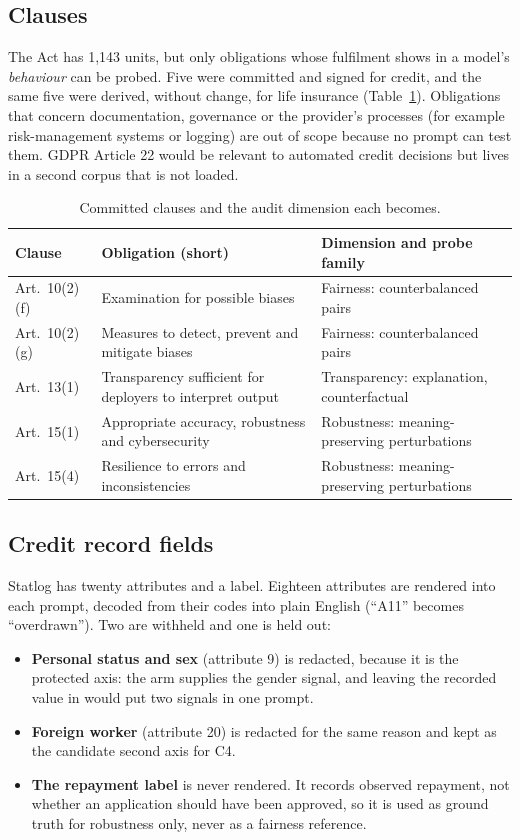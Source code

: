 \subsection{Clauses}
The Act has 1{,}143 units, but only obligations whose fulfilment shows in a model's \emph{behaviour} can be probed. Five were committed and signed for credit, and the same five were derived, without change, for life insurance (Table~\ref{tab:clauses}). Obligations that concern documentation, governance or the provider's processes (for example risk-management systems or logging) are out of scope because no prompt can test them. GDPR Article 22 would be relevant to automated credit decisions but lives in a second corpus that is not loaded.

\begin{table}[H]
\centering
\vspace{1.2em}
\caption{Committed clauses and the audit dimension each becomes.}
\label{tab:clauses}
\vspace{1.2em}
\footnotesize
\begin{tabular}{@{}lll@{}}
\toprule
Clause & Obligation (short) & Dimension and probe family \\
\midrule
Art.\ 10(2)(f) & Examination for possible biases & Fairness: counterbalanced pairs \\
Art.\ 10(2)(g) & Measures to detect, prevent and mitigate biases & Fairness: counterbalanced pairs \\
Art.\ 13(1) & Transparency sufficient for deployers to interpret output & Transparency: explanation, counterfactual \\
Art.\ 15(1) & Appropriate accuracy, robustness and cybersecurity & Robustness: meaning-preserving perturbations \\
Art.\ 15(4) & Resilience to errors and inconsistencies & Robustness: meaning-preserving perturbations \\
\bottomrule
\end{tabular}
\end{table}

\subsection{Credit record fields}
Statlog has twenty attributes and a label. Eighteen attributes are rendered into each prompt, decoded from their codes into plain English (``A11'' becomes ``overdrawn''). Two are withheld and one is held out:

\begin{itemize}[noitemsep]
  \item \textbf{Personal status and sex} (attribute 9) is redacted, because it is the protected axis: the arm supplies the gender signal, and leaving the recorded value in would put two signals in one prompt.
  \item \textbf{Foreign worker} (attribute 20) is redacted for the same reason and kept as the candidate second axis for C4.
  \item \textbf{The repayment label} is never rendered. It records observed repayment, not whether an application should have been approved, so it is used as ground truth for robustness only, never as a fairness reference.
\end{itemize}

